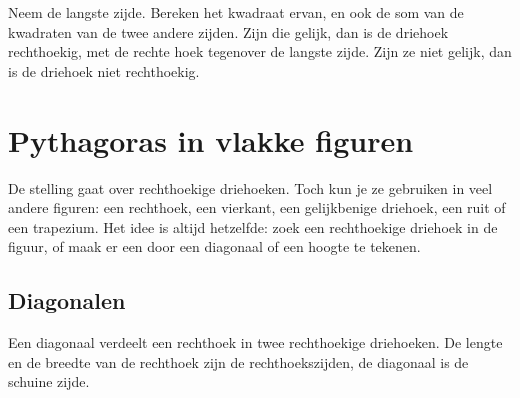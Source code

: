 \begin{werkwijze}
Neem de langste zijde. Bereken het kwadraat ervan, en ook de som van de kwadraten van de twee andere zijden. Zijn die gelijk, dan is de driehoek rechthoekig, met de rechte hoek tegenover de langste zijde. Zijn ze niet gelijk, dan is de driehoek niet rechthoekig.
\end{werkwijze}

\begin{oefeningen}
\end{oefeningen}

\section{Pythagoras in vlakke figuren}

De stelling gaat over rechthoekige driehoeken. Toch kun je ze gebruiken in veel andere figuren: een rechthoek, een vierkant, een gelijkbenige driehoek, een ruit of een trapezium. Het idee is altijd hetzelfde: zoek een rechthoekige driehoek in de figuur, of maak er een door een diagonaal of een hoogte te tekenen.

\subsection{Diagonalen}

Een diagonaal verdeelt een rechthoek in twee rechthoekige driehoeken. De lengte en de breedte van de rechthoek zijn de rechthoekszijden, de diagonaal is de schuine zijde.


